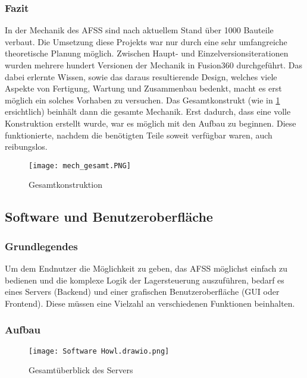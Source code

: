 \begin{minipage}{\textwidth}
    
\subsubsection{Fazit}
In der Mechanik des AFSS sind nach aktuellem Stand über 1000 Bauteile verbaut. Die Umsetzung diese Projekts war nur durch eine sehr umfangreiche theoretische Planung möglich. Zwischen Haupt- und Einzelversionsiterationen wurden mehrere hundert Versionen der Mechanik in Fusion360 durchgeführt. Das dabei erlernte Wissen, sowie das daraus resultierende Design, welches viele Aspekte von Fertigung, Wartung und Zusammenbau bedenkt, macht es erst möglich ein solches Vorhaben zu versuchen. Das Gesamtkonstrukt (wie in \ref{AFSS-mech-ges} ersichtlich) beinhält dann die gesamte Mechanik. Erst dadurch, dass eine volle Konstruktion erstellt wurde, war es möglich mit den Aufbau zu beginnen. Diese funktionierte, nachdem die benötigten Teile soweit verfügbar waren, auch reibungslos.

\begin{figure}[H]
    \texttt{[image: mech\_gesamt.PNG]}
    \caption{Gesamtkonstruktion}
    \label{AFSS-mech-ges}
\end{figure}
    
\end{minipage}


\newpage
\subsection{Software und Benutzeroberfläche}

\subsubsection{Grundlegendes}
Um dem Endnutzer die Möglichkeit zu geben, das AFSS möglichst einfach zu bedienen und die komplexe Logik der Lagersteuerung auszuführen, bedarf es eines Servers (Backend) und einer grafischen Benutzeroberfläche (GUI oder Frontend). Diese müssen eine Vielzahl an verschiedenen Funktionen beinhalten.

\subsubsection{Aufbau}
\begin{figure}[h]
    \texttt{[image: Software Howl.drawio.png]}
    \caption{Gesamtüberblick des Servers}
\end{figure}

